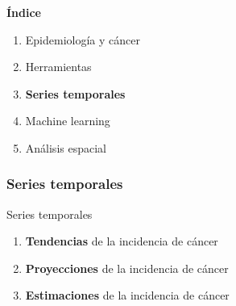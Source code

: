 \documentclass{beamer}
\begin{document}

\begin{frame}\frametitle{}
	
	\Large{\textbf{Índice}}\\[2ex]
	\normalsize
	\begin{enumerate}
		\item Epidemiología y cáncer\\[2ex]
		\item Herramientas\\[2ex]
		\item \textbf{Series temporales} \\[2ex]
		\item Machine learning  \\[2ex]
		\item Análisis espacial \\[2ex]
	\end{enumerate}
	
\end{frame}

\begin{frame}\frametitle{Series temporales}
	
\begin{block}{Series temporales}
	\begin{enumerate}
		\item \textbf{Tendencias} de la incidencia de cáncer\\[2ex]
		\item \textbf{Proyecciones} de la incidencia de cáncer\\[2ex]
		\item \textbf{Estimaciones} de la incidencia de cáncer\\[2ex]
	\end{enumerate}
\end{block}
	
\end{frame}

\end{document}
